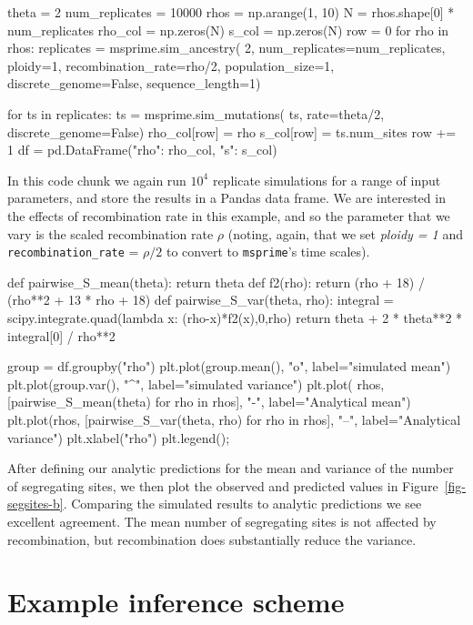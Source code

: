 \documentclass[graybox]{svmult}
\newcommand{\msprime}[0]{\texttt{msprime}}
\begin{document}
\begin{pythoncode}
theta = 2
num_replicates = 10000
rhos = np.arange(1, 10)
N = rhos.shape[0] * num_replicates
rho_col = np.zeros(N)
s_col = np.zeros(N)
row = 0
for rho in rhos:
    replicates = msprime.sim_ancestry(
        2, num_replicates=num_replicates, ploidy=1,
        recombination_rate=rho/2, population_size=1,
        discrete_genome=False, sequence_length=1)

    for ts in replicates:
        ts = msprime.sim_mutations(
            ts, rate=theta/2, discrete_genome=False)
        rho_col[row] = rho
        s_col[row] = ts.num_sites
        row += 1
df = pd.DataFrame({"rho": rho_col, "s": s_col})
\end{pythoncode}

In this code chunk we again run $10^4$ replicate simulations for a range
of input parameters, and store the results in a Pandas data frame. We
are interested in the effects of recombination rate in this example,
and so the parameter that we vary is the scaled recombination rate
$\rho$ (noting, again, that we set \emph{ploidy = 1} and
\texttt{recombination\_rate} = $\rho / 2$ to convert to \msprime's
time scales).

\begin{pythoncode}
def pairwise_S_mean(theta):
    return theta
def f2(rho):
    return (rho + 18) / (rho**2 + 13 * rho + 18)
def pairwise_S_var(theta, rho):
    integral = scipy.integrate.quad(lambda x: (rho-x)*f2(x),0,rho)
    return theta + 2 * theta**2 * integral[0] / rho**2

group = df.groupby("rho")
plt.plot(group.mean(), "o", label="simulated mean")
plt.plot(group.var(), "^", label="simulated variance")
plt.plot(
    rhos, [pairwise_S_mean(theta) for rho in rhos], "-",
    label="Analytical mean")
plt.plot(rhos, [pairwise_S_var(theta, rho) for rho in rhos], "--",
label="Analytical variance")
plt.xlabel("rho")
plt.legend();
\end{pythoncode}

After defining our analytic predictions for the mean and variance of the
number of segregating sites, we then plot the observed and predicted values
in Figure~\ref{fig-segsites-b}.
Comparing the simulated results to analytic predictions we see
excellent agreement. The mean number of segregating sites is not
affected by recombination, but recombination does substantially reduce
the variance.

\section{Example inference scheme}\label{sec:inference}
\end{document}
